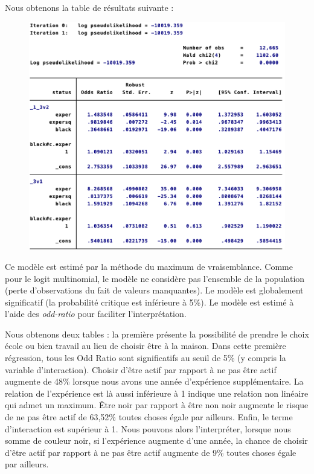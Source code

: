 Nous obtenons la table de résultats suivante : 

\begin{figure}[h]
    \includegraphics[scale = 0.55]{100_tab_results/logitsequentiel.png}
    \centering
\end{figure}

Ce modèle est estimé par la méthode du maximum de vraisemblance. Comme pour le logit multinomial, le modèle ne considère pas l’ensemble de la population (perte d’observations du fait de valeurs manquantes). Le modèle est globalement significatif (la probabilité critique est inférieure à 5\%). Le modèle est estimé à l’aide des \emph{odd-ratio} pour faciliter l’interprétation.

\vspace*{0.3cm}

Nous obtenons deux tables : la première présente la possibilité de prendre le choix école ou bien travail au lieu de choisir être à la maison. Dans cette première régression, tous les Odd Ratio sont significatifs au seuil de 5\% (y compris la variable d’interaction). Choisir d’être actif par rapport à ne pas être actif augmente de 48\% lorsque nous avons une année d’expérience supplémentaire. La relation de l’expérience est là aussi inférieure à 1 indique une relation non linéaire qui admet un maximum. Être noir par rapport à être non noir augmente le risque de ne pas être actif de 63,52\% toutes choses égale par ailleurs. Enfin, le terme d’interaction est supérieur à 1. Nous pouvons alors l’interpréter, lorsque nous somme de couleur noir, si l’expérience augmente d’une année, la chance de choisir d’être actif par rapport à ne pas être actif augmente de 9\% toutes choses égale par ailleurs. 

